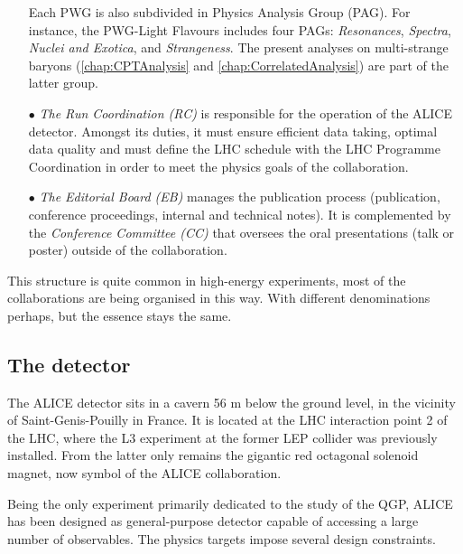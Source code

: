 \begin{itemize}
Each PWG is also subdivided in Physics Analysis Group (PAG). For instance, the PWG-Light Flavours includes four PAGs: \textit{Resonances}, \textit{Spectra}, \textit{Nuclei and Exotica}, and \textit{Strangeness}. The present analyses on multi-strange baryons (\chap\ref{chap:CPTAnalysis} and \ref{chap:CorrelatedAnalysis}) are part of the latter group.

\item[$\bullet$] \textit{The Run Coordination (RC)} is responsible for the operation of the ALICE detector. Amongst its duties, it must ensure efficient data taking, optimal data quality and must define the LHC schedule with the LHC Programme Coordination in order to meet the physics goals of the collaboration.
\item[$\bullet$] \textit{The Editorial Board (EB)} manages the publication process (publication, conference proceedings, internal and technical notes). It is complemented by the \textit{Conference Committee (CC)} that oversees the oral presentations (talk or poster) outside of the collaboration.
\end{itemize}

This structure is quite common in high-energy experiments, most of the collaborations are being organised in this way. With different denominations perhaps, but the essence stays the same.

\subsection{The detector}
\label{subsec:ALICEDetector}

The ALICE detector sits in a cavern 56 m below the ground level, in the vicinity of Saint-Genis-Pouilly in France. It is located at the LHC interaction point 2 of the LHC, where the L3 experiment at the former LEP collider was previously installed. From the latter only remains the gigantic red octagonal solenoid magnet, now symbol of the ALICE collaboration.

Being the only experiment primarily dedicated to the study of the QGP, ALICE has been designed as general-purpose detector capable of accessing a large number of observables. The physics targets impose several design constraints.

